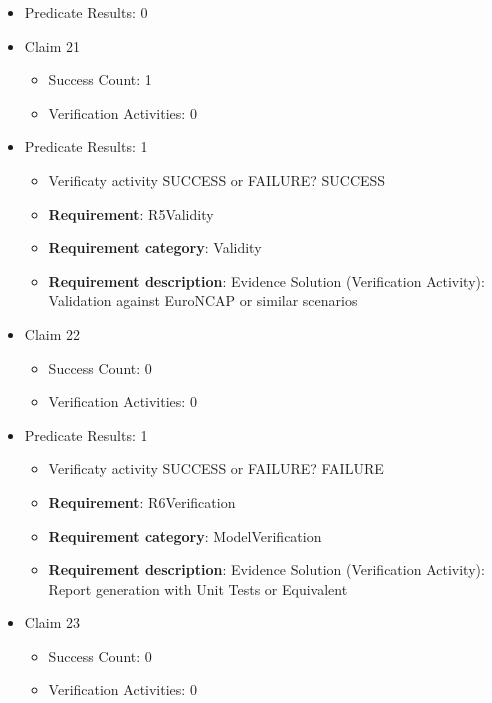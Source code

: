 \documentclass{article}
\begin{document}
\begin{itemize}
\begin{itemize}
				\end{itemize}
				
									    
				\item Predicate Results: 0

  				  \item Claim 21
				\begin{itemize}
			    	\item Success Count: 1 
			    	\item Verification Activities: 0
				\end{itemize}
				
									    
				\item Predicate Results: 1
					\begin{itemize}				
					\item Verificaty activity SUCCESS or FAILURE? SUCCESS
					
					\item \textbf{Requirement}: R5Validity 
					\item \textbf{Requirement category}: Validity
					\item \textbf{Requirement description}: Evidence Solution (Verification Activity): Validation against EuroNCAP or similar scenarios
					\end{itemize}

  				  \item Claim 22
				\begin{itemize}
			    	\item Success Count: 0 
			    	\item Verification Activities: 0
				\end{itemize}
				
									    
				\item Predicate Results: 1
					\begin{itemize}				
					\item Verificaty activity SUCCESS or FAILURE? FAILURE
					
					\item \textbf{Requirement}: R6Verification 
					\item \textbf{Requirement category}: ModelVerification
					\item \textbf{Requirement description}: Evidence Solution (Verification Activity): Report generation with Unit Tests or Equivalent
					\end{itemize}

  				  \item Claim 23
				\begin{itemize}
			    	\item Success Count: 0 
			    	\item Verification Activities: 0
				\end{itemize}
				

\end{itemize}
\end{document}
